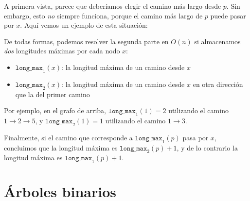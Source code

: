 A primera vista, parece que deberíamos elegir el camino más
largo desde $p$. Sin embargo, esto \emph{no} siempre funciona,
porque el camino más largo de $p$ puede pasar por $x$. Aquí
vemos un ejemplo de esta situación:
\begin{center}
\end{center}

De todas formas, podemos resolver la segunda parte en $O(n)$
si almacenamos \emph{dos} longitudes máximas por cada nodo $x$:
\begin{itemize}
    \item $\texttt{long\_max}_1(x)$:
          la longitud máxima de un camino desde $x$
    \item $\texttt{long\_max}_2(x)$:
          la longitud máxima de un camino desde $x$
          en otra dirección que la del primer camino
\end{itemize}
Por ejemplo, en el grafo de arriba,
$\texttt{long\_max}_1(1)=2$
utilizando el camino $1 \rightarrow 2 \rightarrow 5$,
y $\texttt{long\_max}_2(1)=1$
utilizando el camino $1 \rightarrow 3$.

Finalmente, si el camino que corresponde a $\texttt{long\_max}_1(p)$
pasa por $x$, concluimos que la longitud máxima es
$\texttt{long\_max}_2(p)+1$, y de lo contrario la longitud máxima es
$\texttt{long\_max}_1(p)+1$.

\section{Árboles binarios}


